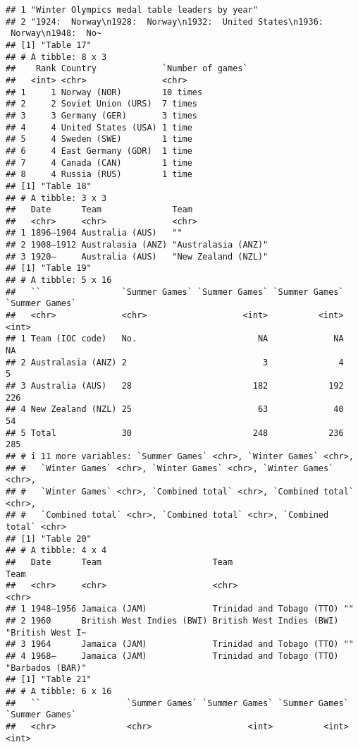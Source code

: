 \documentclass[
]{article}
\begin{document}
\begin{verbatim}
## 1 "Winter Olympics medal table leaders by year"                                 
## 2 "1924:  Norway\n1928:  Norway\n1932:  United States\n1936:  Norway\n1948:  No~
## [1] "Table 17"
## # A tibble: 8 x 3
##    Rank Country             `Number of games`
##   <int> <chr>               <chr>            
## 1     1 Norway (NOR)        10 times         
## 2     2 Soviet Union (URS)  7 times          
## 3     3 Germany (GER)       3 times          
## 4     4 United States (USA) 1 time           
## 5     4 Sweden (SWE)        1 time           
## 6     4 East Germany (GDR)  1 time           
## 7     4 Canada (CAN)        1 time           
## 8     4 Russia (RUS)        1 time           
## [1] "Table 18"
## # A tibble: 3 x 3
##   Date      Team              Team               
##   <chr>     <chr>             <chr>              
## 1 1896–1904 Australia (AUS)   ""                 
## 2 1908–1912 Australasia (ANZ) "Australasia (ANZ)"
## 3 1920–     Australia (AUS)   "New Zealand (NZL)"
## [1] "Table 19"
## # A tibble: 5 x 16
##   ``                `Summer Games` `Summer Games` `Summer Games` `Summer Games`
##   <chr>             <chr>                   <int>          <int>          <int>
## 1 Team (IOC code)   No.                        NA             NA             NA
## 2 Australasia (ANZ) 2                           3              4              5
## 3 Australia (AUS)   28                        182            192            226
## 4 New Zealand (NZL) 25                         63             40             54
## 5 Total             30                        248            236            285
## # i 11 more variables: `Summer Games` <chr>, `Winter Games` <chr>,
## #   `Winter Games` <chr>, `Winter Games` <chr>, `Winter Games` <chr>,
## #   `Winter Games` <chr>, `Combined total` <chr>, `Combined total` <chr>,
## #   `Combined total` <chr>, `Combined total` <chr>, `Combined total` <chr>
## [1] "Table 20"
## # A tibble: 4 x 4
##   Date      Team                      Team                      Team            
##   <chr>     <chr>                     <chr>                     <chr>           
## 1 1948–1956 Jamaica (JAM)             Trinidad and Tobago (TTO) ""              
## 2 1960      British West Indies (BWI) British West Indies (BWI) "British West I~
## 3 1964      Jamaica (JAM)             Trinidad and Tobago (TTO) ""              
## 4 1968–     Jamaica (JAM)             Trinidad and Tobago (TTO) "Barbados (BAR)"
## [1] "Table 21"
## # A tibble: 6 x 16
##   ``                 `Summer Games` `Summer Games` `Summer Games` `Summer Games`
##   <chr>              <chr>                   <int>          <int>          <int>

\end{verbatim}
\end{document}
